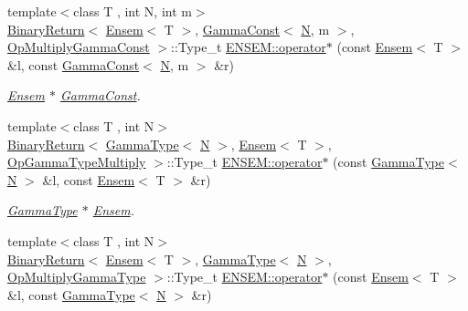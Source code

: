 \begin{DoxyCompactItemize}
{\footnotesize template$<$class T , int N, int m$>$ }\\\mbox{\hyperlink{structENSEM_1_1BinaryReturn}{Binary\+Return}}$<$ \mbox{\hyperlink{classENSEM_1_1Ensem}{Ensem}}$<$ T $>$, \mbox{\hyperlink{classENSEM_1_1GammaConst}{Gamma\+Const}}$<$ \mbox{\hyperlink{operator__name__util_8cc_a7722c8ecbb62d99aee7ce68b1752f337}{N}}, m $>$, \mbox{\hyperlink{structENSEM_1_1OpMultiplyGammaConst}{Op\+Multiply\+Gamma\+Const}} $>$\+::Type\+\_\+t \mbox{\hyperlink{group__eensem_gaada3f84ca5744bafe60557482cc90c26}{E\+N\+S\+E\+M\+::operator$\ast$}} (const \mbox{\hyperlink{classENSEM_1_1Ensem}{Ensem}}$<$ T $>$ \&l, const \mbox{\hyperlink{classENSEM_1_1GammaConst}{Gamma\+Const}}$<$ \mbox{\hyperlink{operator__name__util_8cc_a7722c8ecbb62d99aee7ce68b1752f337}{N}}, m $>$ \&r)
\begin{DoxyCompactList}\small\item\em \mbox{\hyperlink{classENSEM_1_1Ensem}{Ensem}} $\ast$ \mbox{\hyperlink{classENSEM_1_1GammaConst}{Gamma\+Const}}. \end{DoxyCompactList}\item 
{\footnotesize template$<$class T , int N$>$ }\\\mbox{\hyperlink{structENSEM_1_1BinaryReturn}{Binary\+Return}}$<$ \mbox{\hyperlink{classENSEM_1_1GammaType}{Gamma\+Type}}$<$ \mbox{\hyperlink{operator__name__util_8cc_a7722c8ecbb62d99aee7ce68b1752f337}{N}} $>$, \mbox{\hyperlink{classENSEM_1_1Ensem}{Ensem}}$<$ T $>$, \mbox{\hyperlink{structENSEM_1_1OpGammaTypeMultiply}{Op\+Gamma\+Type\+Multiply}} $>$\+::Type\+\_\+t \mbox{\hyperlink{group__eensem_ga399b896691f2d528edcade561c6e571d}{E\+N\+S\+E\+M\+::operator$\ast$}} (const \mbox{\hyperlink{classENSEM_1_1GammaType}{Gamma\+Type}}$<$ \mbox{\hyperlink{operator__name__util_8cc_a7722c8ecbb62d99aee7ce68b1752f337}{N}} $>$ \&l, const \mbox{\hyperlink{classENSEM_1_1Ensem}{Ensem}}$<$ T $>$ \&r)
\begin{DoxyCompactList}\small\item\em \mbox{\hyperlink{classENSEM_1_1GammaType}{Gamma\+Type}} $\ast$ \mbox{\hyperlink{classENSEM_1_1Ensem}{Ensem}}. \end{DoxyCompactList}\item 
{\footnotesize template$<$class T , int N$>$ }\\\mbox{\hyperlink{structENSEM_1_1BinaryReturn}{Binary\+Return}}$<$ \mbox{\hyperlink{classENSEM_1_1Ensem}{Ensem}}$<$ T $>$, \mbox{\hyperlink{classENSEM_1_1GammaType}{Gamma\+Type}}$<$ \mbox{\hyperlink{operator__name__util_8cc_a7722c8ecbb62d99aee7ce68b1752f337}{N}} $>$, \mbox{\hyperlink{structENSEM_1_1OpMultiplyGammaType}{Op\+Multiply\+Gamma\+Type}} $>$\+::Type\+\_\+t \mbox{\hyperlink{group__eensem_ga5a4ddba3b396c11e474246b57940a2cc}{E\+N\+S\+E\+M\+::operator$\ast$}} (const \mbox{\hyperlink{classENSEM_1_1Ensem}{Ensem}}$<$ T $>$ \&l, const \mbox{\hyperlink{classENSEM_1_1GammaType}{Gamma\+Type}}$<$ \mbox{\hyperlink{operator__name__util_8cc_a7722c8ecbb62d99aee7ce68b1752f337}{N}} $>$ \&r)

\end{DoxyCompactItemize}
